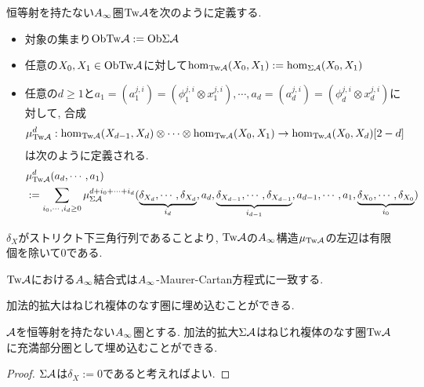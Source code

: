 \documentclass[uplatex, a4paper, 14Q, dvipdfmx]{jsarticle}
\begin{document}
\begin{definition}
  恒等射を持たない$A_{\infty}$圏$\mathrm{Tw}\mathcal{A}$を次のように定義する.
  \begin{itemize}
    \item 対象の集まり$\mathrm{Ob}\mathrm{Tw}\mathcal{A} := \mathrm{Ob}\Sigma\mathcal{A}$
    \item 任意の$X_0,X_1 \in \mathrm{Ob}\mathrm{Tw}\mathcal{A}$に対して$\hom_{\mathrm{Tw}\mathcal{A}}(X_0,X_1) : = \hom_{\Sigma\mathcal{A}}(X_0,X_1)$
    \item 任意の$d \geq 1$と$a_1 = (a_1^{j,i}) = (\phi_1^{j,i} \otimes x_1^{j,i}), \cdots, a_d = (a_d^{j,i}) = (\phi_d^{j,i} \otimes x_d^{j,i})$に対して, 合成
    \begin{align*}
      \mu^d_{\mathrm{Tw}\mathcal{A}} : \hom_{\mathrm{Tw}\mathcal{A}}(X_{d-1},X_d) \otimes \cdots \otimes \hom_{\mathrm{Tw}\mathcal{A}}(X_0,X_1) \to \hom_{\mathrm{Tw}\mathcal{A}}(X_0,X_d)[2-d]
    \end{align*}
    は次のように定義される. 
    \begin{align*}
      &\mu^d_{\mathrm{Tw}\mathcal{A}}(a_d,\cdots,a_1) \\
      &:= \sum_{i_0,\cdots,i_d \geq 0} \mu^{d+i_0+\cdots+i_d}_{\Sigma\mathcal{A}} (
      \underbrace{\delta_{X_d},\cdots,\delta_{X_d}}_{i_d}, a_d, 
      \underbrace{\delta_{X_{d-1}},\cdots,\delta_{X_{d-1}}}_{i_{d-1}}, a_{d-1}, 
      \cdots, a_1, 
      \underbrace{\delta_{X_0},\cdots,\delta_{X_0}}_{i_0})
    \end{align*}
  \end{itemize}
\end{definition}

\begin{remark}
  $\delta_X$がストリクト下三角行列であることより, $\mathrm{Tw}\mathcal{A}$の$A_{\infty}$構造$\mu_{\mathrm{Tw}\mathcal{A}}$の左辺は有限個を除いて$0$である.
\end{remark}

\begin{remark}
  $\mathrm{Tw}\mathcal{A}$における$A_{\infty}$結合式は$A_{\infty}$-Maurer-Cartan方程式に一致する. 
\end{remark}

加法的拡大はねじれ複体のなす圏に埋め込むことができる.

\begin{lemma}
  $\mathcal{A}$を恒等射を持たない$A_{\infty}$圏とする. 
  加法的拡大$\Sigma\mathcal{A}$はねじれ複体のなす圏$\mathrm{Tw}\mathcal{A}$に充満部分圏として埋め込むことができる. 
\end{lemma}

\begin{proof}
  $\Sigma\mathcal{A}$は$\delta_X := 0$であると考えればよい.
\end{proof}
\end{document}
